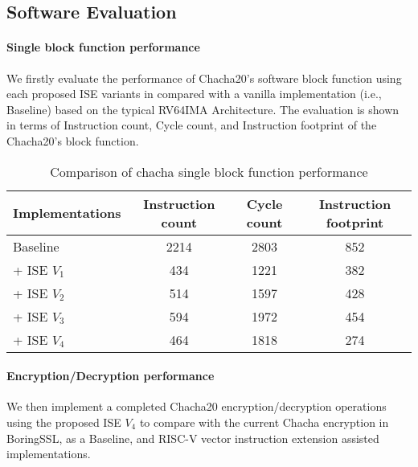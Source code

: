 \subsection{Software Evaluation}

\paragraph{Single block function performance}
We firstly evaluate the performance of Chacha20's software block function using each proposed ISE variants in compared with a vanilla implementation (i.e., Baseline) based on the typical RV64IMA Architecture. The evaluation is shown in terms of Instruction count, Cycle count, and Instruction footprint of the Chacha20's block function.

\begin{table}
\caption{Comparison of chacha single block function performance}
\label{tab:res:sw:perf}
\begin{tabular}{lccc}
\toprule            
Implementations        & Instruction count   & Cycle count & Instruction footprint\\

\midrule
Baseline     & 2214     & 2803  &  852 \\
 + ISE $V_1$ &  434     & 1221  &  382 \\
 + ISE $V_2$ &  514     & 1597  &  428 \\
 + ISE $V_3$ &  594     & 1972  &  454 \\
 + ISE $V_4$ &  464     & 1818  &  274 \\

\bottomrule
\end{tabular}
\end{table}

\paragraph{Encryption/Decryption performance}
We then implement a completed Chacha20 encryption/decryption operations using the proposed ISE $V_4$ to compare with the current Chacha encryption in BoringSSL, as a Baseline, and RISC-V vector instruction extension assisted implementations.

